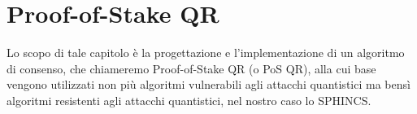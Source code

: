 \chapter{Proof-of-Stake QR}
Lo scopo di tale capitolo è la progettazione e l'implementazione di un algoritmo di consenso, che chiameremo Proof-of-Stake QR (o PoS QR), alla cui base vengono utilizzati non più algoritmi vulnerabili agli attacchi quantistici ma bensì algoritmi resistenti agli attacchi quantistici, nel nostro caso lo SPHINCS.